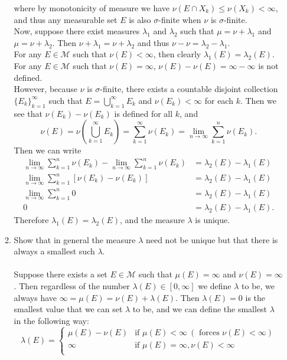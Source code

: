 \begin{enumerate}
\begin{enumerate}[label=(\roman*),align=left]
\[		\]
		where by monotonicity of measure we have $\nu(E\cap X_k)\le\nu(X_k)<\infty$, and thus any measurable set $E$ is also $\sigma$-finite when $\nu$ is $\sigma$-finite.
		\\Now, suppose there exist measures $\lambda_1$ and $\lambda_2$ such that $\mu=\nu+\lambda_1$ and $\mu=\nu+\lambda_2$.
		Then $\nu+\lambda_1=\nu+\lambda_2$ and thus $\nu-\nu=\lambda_2-\lambda_1$.
		\\For any $E\in\mathcal{M}$ such that $\nu(E)<\infty$, then clearly $\lambda_1(E)=\lambda_2(E)$.
		\\For any $E\in\mathcal{M}$ such that $\nu(E)=\infty$, $\nu(E)-\nu(E)=\infty-\infty$ is not defined. 
		\\However, because $\nu$ is $\sigma$-finite, there exists a countable disjoint collection $\{E_k\}_{k=1}^\infty$ such that $E=\bigcup_{k=1}^\infty E_k$ and $\nu(E_k)<\infty$ for each $k$. 
		Then we see that $\nu(E_k)-\nu(E_k)$ is defined for all $k$, and
		\[
			\nu(E)=\nu(\bigcup_{k=1}^\infty E_k)=\sum_{k=1}^\infty \nu(E_k)=\lim_{n\to\infty}\sum_{k=1}^n \nu(E_k).
		\] 
		Then we can write 
		\begin{align*}
			\lim_{n\to\infty}\sum_{k=1}^n \nu(E_k)-\lim_{n\to\infty}\sum_{k=1}^n \nu(E_k)&=\lambda_2(E)-\lambda_1(E)\\
			\lim_{n\to\infty}\sum_{k=1}^n [\nu(E_k)-\nu(E_k)]&=\lambda_2(E)-\lambda_1(E)\\
			\lim_{n\to\infty}\sum_{k=1}^n 0&=\lambda_2(E)-\lambda_1(E)\\
			0&=\lambda_2(E)-\lambda_1(E).
		\end{align*}
		Therefore $\lambda_1(E)=\lambda_2(E)$, and the measure $\lambda$ is unique.
		\item Show that in general the measure $\lambda$ need not be unique but that there is always a smallest such $\lambda$.\\
		\\Suppose there exists a set $E\in\mathcal{M}$ such that $\mu(E)=\infty$ and $\nu(E)=\infty$. 
		Then regardless of the number $\lambda(E)\in[0,\infty]$ we define $\lambda$ to be, we always have $\infty=\mu(E)=\nu(E)+\lambda(E)$.
		Then $\lambda(E)=0$ is the smallest value that we can set $\lambda$ to be, and we can define the smallest $\lambda$ in the following way:
		\[
		\lambda(E)=
		\begin{cases}
			\mu(E)-\nu(E)&\text{if }\mu(E)<\infty\ (\text{ forces }\nu(E)<\infty)\\
			\infty&\text{if }\mu(E)=\infty,\nu(E)<\infty\\

\end{cases}\]
\end{enumerate}
\end{enumerate}
